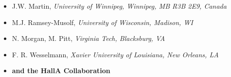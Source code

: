 \begin{itemize}
\item J.W. Martin,  
\emph{University of Winnipeg, Winnipeg, MB R3B 2E9, Canada}
 
\item  M.J. Ramsey-Musolf,   
\emph{University of Wisconsin, Madison, WI}
 
\item N. Morgan, M. Pitt, 
\emph{Virginia Tech, Blacksburg, VA}
  
\item F. R. Wesselmann,  
\emph{Xavier University of Louisiana, New Orleans, LA}
  
\item \bf{and the HallA Collaboration}
 
 \end{itemize}